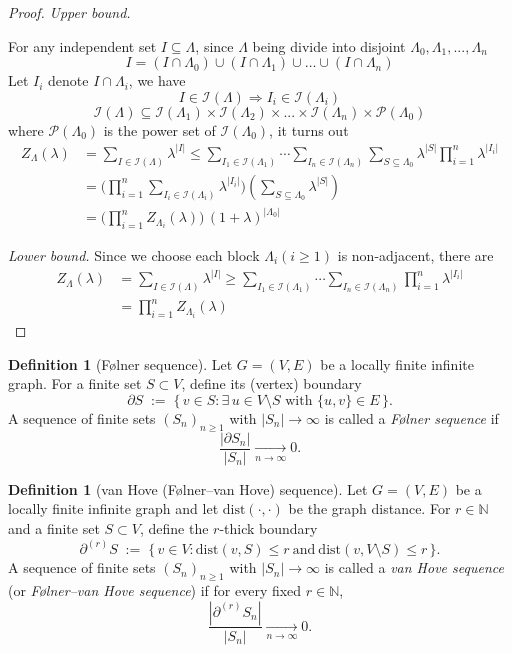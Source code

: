 \documentclass[a4paper,11pt]{article}
\theoremstyle{plain}
\theoremstyle{definition}
\newtheorem{definition}[theorem]{Definition}
\theoremstyle{remark}
\newcommand{\1}{\mathbf{1}}
\newcommand{\calI}{\mathcal{I}}
\begin{document}
\begin{proof}

\emph{Upper bound.}

    For any independent set $I\subseteq \Lambda$, since $\Lambda$ being divide into disjoint $\Lambda_0, \Lambda_1, ..., \Lambda_n$
    $$I=(I\cap\Lambda_0)\cup(I\cap\Lambda_1)\cup\dots\cup(I\cap\Lambda_n)$$
    Let $I_i$ denote $I\cap\Lambda_i$, we have
    $$I\in\calI (\Lambda)\Rightarrow I_i\in\calI (\Lambda_i)$$
    $$\calI(\Lambda)\subseteq\calI(\Lambda_1)\times\calI(\Lambda_2)\times...\times\calI(\Lambda_n)\times\mathcal{P}(\Lambda_0)$$
    where $\mathcal{P}(\Lambda_0)$ is the power set of $\calI(\Lambda_0)$, it turns out 
    \begin{align}
       Z_\Lambda(\lambda)&=\sum_{I\in\calI(\Lambda)}\lambda^{|I|}\le\sum_{I_1\in\calI(\Lambda_1)}\cdots\sum_{I_n\in\calI(\Lambda_n)}\sum_{S\subseteq\Lambda_0}\lambda^{|S|}\prod^n_{i=1}\lambda^{|I_i|}\\
       &=\bigl(\prod^n_{i=1}\sum_{I_i\in\calI(\Lambda_i)}\lambda^{|I_i|}\bigr)(\sum_{S\subseteq\Lambda_0}\lambda^{|S|})\\
       &=\Big(\prod_{i=1}^n Z_{\Lambda_i}(\lambda)\Big)\,(1+\lambda)^{|\Lambda_0|}
    \end{align}

\emph{Lower bound.}
    Since we choose each block $\Lambda_i(i\ge 1)$ is non-adjacent, there are 
    \begin{align}
       Z_\Lambda(\lambda)&=\sum_{I\in\calI(\Lambda)}\lambda^{|I|}\ge\sum_{I_1\in\calI(\Lambda_1)}\cdots\sum_{I_n\in\calI(\Lambda_n)}\prod^n_{i=1}\lambda^{|I_i|}\\
       &=\prod_{i=1}^n Z_{\Lambda_i}(\lambda)
    \end{align}
    
\end{proof}

\begin{definition}[F\o lner sequence]
Let $G=(V,E)$ be a locally finite infinite graph. For a finite set $S\subset V$, define its (vertex) boundary
\[
\partial S \;:=\; \{\, v\in S : \exists\, u\in V\setminus S \text{ with } \{u,v\}\in E \,\}.
\]
A sequence of finite sets $(S_n)_{n\ge 1}$ with $|S_n|\to\infty$ is called a \emph{F\o lner sequence} if
\[
\frac{|\partial S_n|}{|S_n|}\xrightarrow[n\to\infty]{}0.
\]
\end{definition}

\begin{definition}[van Hove (F\o lner--van Hove) sequence]
Let $G=(V,E)$ be a locally finite infinite graph and let $\mathrm{dist}(\cdot,\cdot)$ be the graph distance.
For $r\in\mathbb{N}$ and a finite set $S\subset V$, define the $r$-thick boundary
\[
\partial^{(r)} S \;:=\; \bigl\{\, v\in V : \mathrm{dist}(v,S)\le r \ \text{and}\ \mathrm{dist}(v,V\setminus S)\le r \,\bigr\}.
\]
A sequence of finite sets $(S_n)_{n\ge 1}$ with $|S_n|\to\infty$ is called a \emph{van Hove sequence}
(or \emph{F\o lner--van Hove sequence}) if for every fixed $r\in\mathbb{N}$,
\[
\frac{|\partial^{(r)} S_n|}{|S_n|}\xrightarrow[n\to\infty]{}0.
\]
\end{definition}
\end{document}
